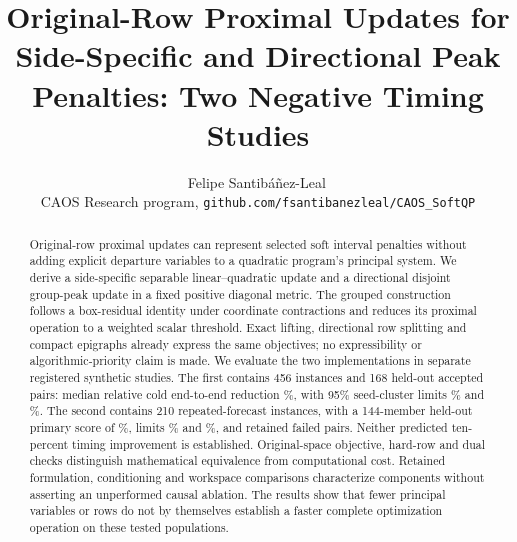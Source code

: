 \documentclass[11pt]{article}
\title{Original-Row Proximal Updates for Side-Specific and Directional Peak Penalties: Two Negative Timing Studies}
\author{Felipe Santib\'a\~nez-Leal\,\orcidlink{0000-0002-0150-3246}\\
\small CAOS Research program, \texttt{github.com/fsantibanezleal/CAOS\_SoftQP}}
\date{\docdate}
\begin{document}
\maketitle
\thispagestyle{plain}
\headerblock
\begin{abstract}
Original-row proximal updates can represent selected soft interval penalties
without adding explicit departure variables to a quadratic program's principal
system. We derive a side-specific separable linear--quadratic update and a
directional disjoint group-peak update in a fixed positive diagonal metric.
The grouped construction follows a box-residual identity under coordinate
contractions and reduces its proximal operation to a weighted scalar threshold.
Exact lifting, directional row splitting and compact epigraphs already express
the same objectives; no expressibility or algorithmic-priority claim is made.
We evaluate the two implementations in separate registered synthetic studies.
The first contains 456 instances and 168 held-out accepted pairs: median
relative cold end-to-end reduction \OriginalEstimate\%, with 95\% seed-cluster
limits \OriginalLower\% and \OriginalUpper\%. The second contains 210
repeated-forecast instances, with a 144-member held-out primary score of
\PrimaryEstimate\%, limits \PrimaryLower\% and \PrimaryUpper\%, and
\PrimaryFailed{} retained failed pairs. Neither predicted ten-percent timing
improvement is established. Original-space objective, hard-row and dual
checks distinguish mathematical equivalence from computational cost. Retained
formulation, conditioning and workspace comparisons characterize components
without asserting an unperformed causal ablation. The results show that fewer
principal variables or rows do not by themselves establish a faster complete
optimization operation on these tested populations.
\end{abstract}















\end{document}
